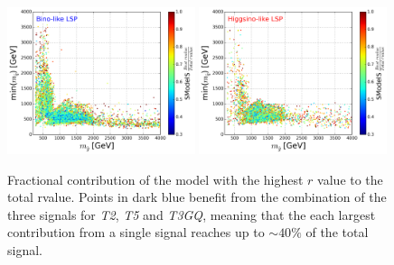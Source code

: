 \documentclass[preprint,number,sort&compress,twocolumn,3p]{elsstyarticle}
\begin{document}
\begin{figure}
	\begin{center}
		\subfigure
		{\includegraphics[width=0.49\textwidth]{PLOTS/Weights/BINO_rValus_Glu_Sq_Ratio.png}}
		\subfigure
		{\includegraphics[width=0.49\textwidth]{PLOTS/Weights/HIGGSINO_rValus_Glu_Sq_Ratio.png}}
	\end{center}
	\caption{Fractional contribution of the model with the highest $r$ value to the total rvalue. Points in dark blue benefit from the combination of the three signals for \textit{T2}, \textit{T5} and \textit{T3GQ}, meaning that the each largest contribution from a single signal reaches up to $\sim 40\%$ of the total signal.} 
	\label{fraction}
\end{figure}
%
%
%
%
%
\end{document}
